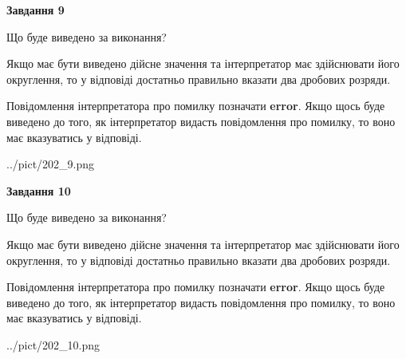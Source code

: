\documentclass[12pt, ukrainian]{article}
\begin{document}
{\begin {Large}
{\begin {center}\textbf{Завдання 9}\end {center}}\par
Що буде виведено за виконання? \par

Якщо має бути виведено дійсне значення та інтерпретатор має здійснювати його округлення, 
то у відповіді достатньо правильно вказати два дробових розряди.

Повідомлення інтерпретатора про помилку позначати \textbf{error}.
Якщо щось буде виведено до того, як інтерпретатор видасть повідомлення про помилку, 
то воно має вказуватись у відповіді. \par

\begin{center}
	{../pict/202_9.png}
\end{center}
\newpage

{\begin {center}\textbf{Завдання 10}\end {center}}\par
Що буде виведено за виконання? \par

Якщо має бути виведено дійсне значення та інтерпретатор має здійснювати його округлення, 
то у відповіді достатньо правильно вказати два дробових розряди.

Повідомлення інтерпретатора про помилку позначати \textbf{error}.
Якщо щось буде виведено до того, як інтерпретатор видасть повідомлення про помилку, 
то воно має вказуватись у відповіді. \par

\begin{center}
	{../pict/202_10.png}
\end{center}
\newpage

\end {Large}}
\end{document}
